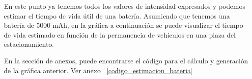 
En este punto ya tenemos todos los valores de intensidad expresados y podemos estimar el tiempo de vida útil de una batería. Asumiendo que tenemos una batería de 5000 mAh, en la gráfica a continuación se puede visualizar el tiempo de vida estimado en función de la permanencia de vehículos en una plaza del estacionamiento.


En la sección de anexos, puede encontrarse el código para el cálculo y generación de la gráfica anterior. Ver anexo ~\ref{codigo_estimacion_bateria}